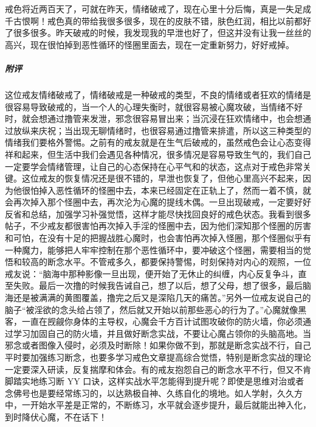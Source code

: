 \begin{case}
    戒色将近两百天了，可就在昨天，情绪破戒了，现在心里十分后悔，真是一失足成千古恨啊！戒色真的带给我很多很多，现在的皮肤不错，肤色红润，相比以前都好了很多很多。昨天破戒的时候，我发现我的早泄也好了，但这并没有让我一丝丝的高兴，现在很怕掉到恶性循环的怪圈里面去，现在一定重新努力，好好戒掉。
    \subparagraph{附评} 这位戒友情绪破戒了，情绪破戒是一种破戒的类型，不良的情绪或者狂欢的情绪是很容易导致破戒的，当一个人的心理失衡时，就很容易被心魔攻破，当情绪不好时，就会想通过撸管来发泄，邪念很容易冒出来；当沉浸在狂欢情绪中，也会想通过放纵来庆祝；当出现无聊情绪时，也很容易通过撸管来排遣，所以这三种类型的情绪我们要格外警惕。之前有的戒友就是在生气后破戒的，虽然戒色会让心态变得祥和起来，但生活中我们会遇见各种情况，很多情况是容易导致生气的，我们自己一定要学会情绪管理，让自己的心态保持在心平气和的状态，这点对于戒色非常关键。这位戒友的恢复情况还是很不错的，早泄也恢复了，但他心里高兴不起来，因为他很怕掉入恶性循环的怪圈中去，本来已经固定在正轨上了，然而一着不慎，就会再次掉入那个怪圈中去，再次沦为心魔的提线木偶。一旦出现破戒，一定要好好反省和总结，加强学习补强觉悟，这样才能尽快找回良好的戒色状态。我看到很多帖子，不少戒友都很害怕再次掉入手淫的怪圈中去，因为他们深知那个怪圈的厉害和可怕，在没有十足的把握战胜心魔时，也会害怕再次掉入怪圈，那个怪圈似乎有一种魔力，能够把人牢牢控制在那个恶性循环中，要冲破这个怪圈，需要相当的觉悟和较高的断念水平。不管戒多久，都要保持警惕，时刻保持对内心的观照，一位戒友说：“脑海中那种影像一旦出现，便开始了无休止的纠缠，内心反复争斗，直至失败。最后一次撸的时候我告诫自己，想了以后，想了父母，想了很多，最后脑海还是被满满的黄图覆盖，撸完之后又是深陷几天的痛苦。”另外一位戒友说自己的脑子“被淫欲的念头给占领了，然后就又开始以前那些恶心的行为了。”心魔就像黑客，一直在觊觎你身体的主导权，心魔会千方百计试图攻破你的防火墙，你必须通过学习加固自己的防火墙，并且做好断念实战，不要让心魔占领你的头脑高地。当邪念或者图像入侵时，必须及时断除！如果你做不到，那就是断念实战不行，自己平时要加强练习断念，也要多学习戒色文章提高综合觉悟，特别是断念实战的理论一定要深入研读，反复揣摩和体会。有的戒友抱怨自己的断念水平不行，但又不肯脚踏实地练习断 YY 口诀，这样实战水平怎能得到提升呢？即使是思维对治或者念佛号也是要经常练习的，以达熟极自神、久练自化的境地。如人学射，久久方中，一开始水平差是正常的，不断练习，水平就会逐步提升，最后就能出神入化，到时降伏心魔，不在话下！
\end{case}

